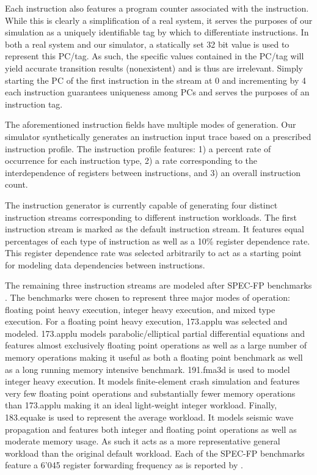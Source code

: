 \documentclass{acm_proc_article-sp}
\begin{document}
Each instruction also features a program counter associated with the instruction.  While this is clearly a simplification of a real system, it serves the purposes of our simulation as a uniquely identifiable tag by which to differentiate instructions.  In both a real system and our simulator, a statically set 32 bit value is used to represent this PC/tag.  As such, the specific values contained in the PC/tag will yield accurate transition results (nonexistent) and is thus are irrelevant.  Simply starting the PC of the first instruction in the stream at 0 and incrementing by 4 each instruction guarantees uniqueness among PCs and serves the purposes of an instruction tag.

The aforementioned instruction fields have multiple modes of generation.  Our simulator synthetically generates an instruction input trace based on a prescribed instruction profile.  The instruction profile features: 1) a percent rate of occurrence for each instruction type, 2) a rate corresponding to the interdependence of registers between instructions, and 3) an overall instruction count.

The instruction generator is currently capable of generating four distinct instruction streams corresponding to different instruction workloads.  The first instruction stream is marked as the default instruction stream.  It features equal percentages of each type of instruction as well as a 10\% register dependence rate.  This register dependence rate was selected arbitrarily to act as a starting point for modeling data dependencies between instructions.

The remaining three instruction streams are modeled after SPEC-FP benchmarks \cite{rupnow}.  The benchmarks were chosen to represent three major modes of operation:  floating point heavy execution, integer heavy execution, and mixed type execution.  For a floating point heavy execution, 173.applu was selected and modeled.  173.applu models parabolic/elliptical partial differential equations and features almost exclusively floating point operations as well as a large number of memory operations making it useful as both a floating point benchmark as well as a long running memory intensive benchmark.  191.fma3d is used to model integer heavy execution.  It models finite-element crash simulation and features very few floating point operations and substantially fewer memory operations than 173.applu making it an ideal light-weight integer workload.  Finally, 183.equake is used to represent the average workload.  It models seismic wave propagation and features both integer and floating point operations as well as moderate memory usage.  As such it acts as a more representative general workload than the original default workload.  Each of the SPEC-FP benchmarks feature a 6{\char'045} register forwarding frequency as is reported by \cite{kucuk}.
\end{document}
